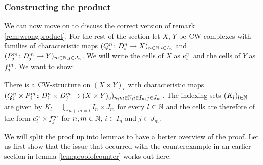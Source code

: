\subsubsection{Constructing the product}\label{sec:constructproduct}

We can now move on to discuss the correct version of remark \ref{rem:wrongproduct}. 
For the rest of the section let $X$, $Y$ be CW-complexes with families of characteristic maps $(Q_i^n \colon D_i^n \to X)_{n \in \bN, i \in I_n}$ and $(P_j^m \colon D_j^m \to Y)_{m \in \bN, j \in J_n}$. We will write the cells of $X$ as $\openCell{n}{i}$ and the cells of $Y$ as $\openCellf{m}{j}$.
We want to show:

\begin{thm}\label{thm:productcw}
    There is a CW-structure on $(X \times Y)_c$ with characteristic maps $(Q_i^n \times P_j^m \colon D_i^n \times D_j^m \to (X \times Y)_c)_{n,m \in \bN,i \in I_n,j \in J_m}$.
    The indexing sets $(K_l)_{l \in \bN}$ are given by $K_l = \bigcup_{n + m = l}I_n \times J_m$ for every $l \in \bN$ and the cells are therefore of the form $\openCell{n}{i} \times \openCellf{m}{j}$ for $n, m \in \bN$, $i \in I_n$ and $j \in J_m$.
\end{thm}

We will split the proof up into lemmas to have a better overview of the proof. 
Let us first show that the issue that occurred with the counterexample in an earlier section in lemma \ref{lem:proofofcounter} works out here:

